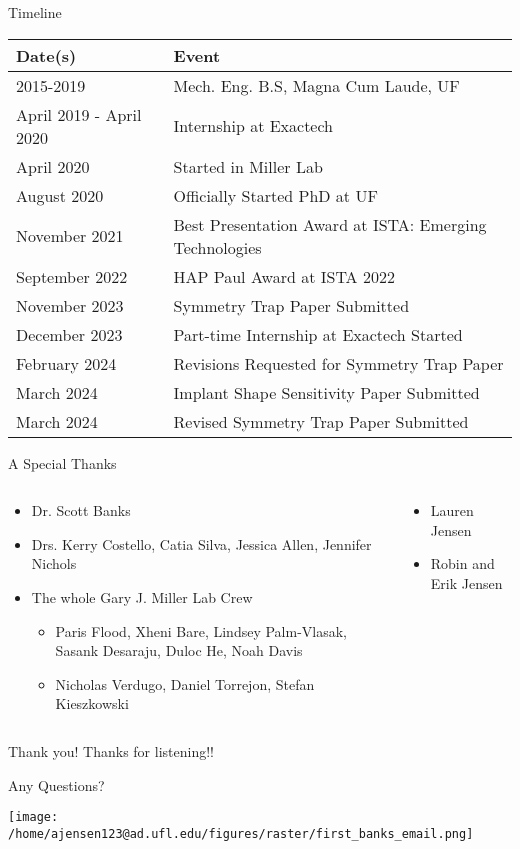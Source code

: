 \documentclass[presentation, aspectratio=1610]{beamer}
\begin{document}
\begin{frame}[label={sec:orgb96b63b}]{Timeline}
\begin{center}
\begin{tabular}{ll}
Date(s) & Event\\
\hline
2015-2019 & Mech. Eng. B.S, Magna Cum Laude, UF\\
April 2019 - April 2020 & Internship at Exactech\\
April 2020 & Started in Miller Lab\\
August 2020 & Officially Started PhD at UF\\
November 2021 & Best Presentation Award at ISTA: Emerging Technologies\\
September 2022 & HAP Paul Award at ISTA 2022\\
November 2023 & Symmetry Trap Paper Submitted\\
December 2023 & Part-time Internship at Exactech Started\\
February 2024 & Revisions Requested for Symmetry Trap Paper\\
\hline
March 2024 & Implant Shape Sensitivity Paper Submitted\\
March 2024 & Revised Symmetry Trap Paper Submitted\\
\end{tabular}
\end{center}
\end{frame}
\begin{frame}[label={sec:org9099a1b}]{A Special Thanks}
\begin{columns}
\begin{column}{0.5\columnwidth}
\begin{itemize}
\item Dr. Scott Banks
\item Drs. Kerry Costello, Catia Silva, Jessica Allen, Jennifer Nichols
\item The whole Gary J. Miller Lab Crew
\begin{itemize}
\item Paris Flood, Xheni Bare, Lindsey Palm-Vlasak, Sasank Desaraju, Duloc He, Noah Davis
\item Nicholas Verdugo, Daniel Torrejon, Stefan Kieszkowski
\end{itemize}
\end{itemize}
\end{column}
\begin{column}{0.5\columnwidth}
\begin{itemize}
\item Lauren Jensen
\item Robin and Erik Jensen
\end{itemize}
\end{column}
\end{columns}
\end{frame}
\begin{frame}[label={sec:org6b4bae5}]{Thank you!}
Thanks for listening!!

Any Questions?

\begin{center}
\texttt{[image: /home/ajensen123@ad.ufl.edu/figures/raster/first\_banks\_email.png]}
\end{center}
\end{frame}
\end{document}
